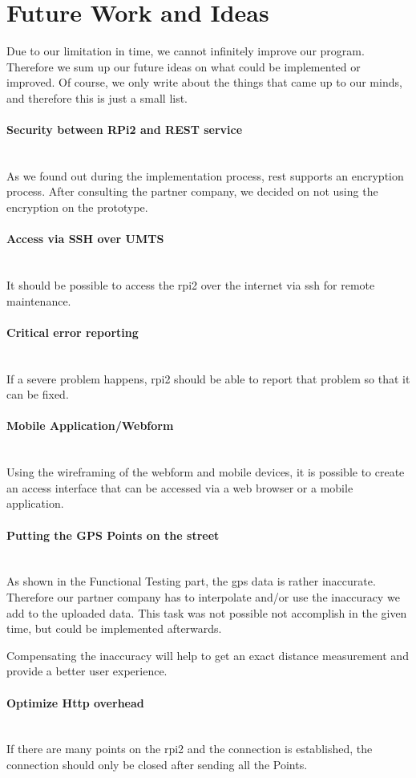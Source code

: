 \section{Future Work and Ideas}
Due to our limitation in time, we cannot infinitely improve our program. Therefore we sum up our future ideas on what could be implemented or improved. Of course, we only write about the things that came up to our minds, and therefore this is just a small list.
\paragraph{Security between RPi2 and REST service}\mbox{}\\
As we found out during the implementation process, \gls{rest} supports an encryption process. After consulting the partner company, we decided on not using the encryption on the prototype.
\paragraph{Access via SSH over UMTS}\mbox{}\\
It should be possible to access the \gls{rpi2} over the internet via \gls{ssh} for remote maintenance.
\paragraph{Critical error reporting}\mbox{}\\
If a severe problem happens, \gls{rpi2} should be able to report that problem so that it can be fixed.
\paragraph{Mobile Application/Webform}\mbox{}\\
Using the wireframing of the webform and mobile devices, it is possible to create an access interface that can be accessed via a web browser or a mobile application.
\paragraph{Putting the GPS Points on the street}\mbox{}\\
As shown in the Functional Testing part, the \gls{gps} data is rather inaccurate. Therefore our partner company has to interpolate and/or use the inaccuracy we add to the uploaded data. This task was not possible not accomplish in the given time, but could be implemented afterwards.

Compensating the inaccuracy will help to get an exact distance measurement and provide a better user experience.
\paragraph{Optimize Http overhead}\mbox{}\\
If there are many points on the \gls{rpi2}  and the connection is established, the connection should only be closed after sending all the Points.
\clearpageauthor